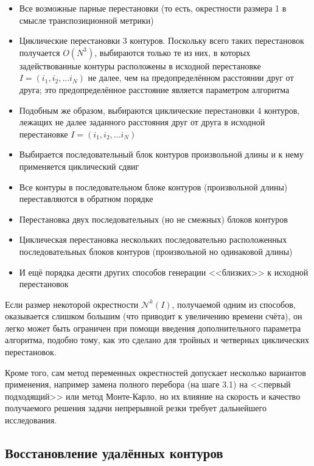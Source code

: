 \documentclass[14pt]{extarticle}
\theoremstyle{plain}%
\theoremstyle{definition}
\theoremstyle{remark}
\begin{document}
\begin{itemize}
  \item
  Все возможные парные перестановки
  (то есть, окрестности размера 1 в смысле транспозиционной метрики)
  \item
  Циклические перестановки 3 контуров.
  Поскольку всего таких перестановок получается
  $O (N ^ 3)$,
  выбираются только те из них,
  в которых задействованные контуры расположены
  в исходной перестановке
  $I = (i_1, i_2, ... i_N)$
  не далее, чем на предопределённом расстоянии
  друг от друга;
  это предопределённое расстояние является
  параметром алгоритма
  \item
  Подобным же образом,
  выбираются циклические перестановки 4 контуров,
  лежащих не далее заданного расстояния
  друг от друга в исходной перестановке
  $I = (i_1, i_2, ... i_N)$
  \item
  Выбирается последовательный блок контуров
  произвольной длины и к нему применяется
  циклический сдвиг
  \item
  Все контуры в последовательном блоке
  контуров
  (произвольной длины)
  переставляются в обратном порядке
  \item
  Перестановка двух последовательных
  (но не смежных) блоков контуров
  \item
  Циклическая перестановка нескольких
  последовательно расположенных
  последовательных блоков контуров
  (произвольной но одинаковой длины)
  \item
  И ещё порядка десяти других способов генерации
  <<близких>> к исходной перестановок
\end{itemize}

Если размер некоторой окрестности
$\mathcal N^k(I)$,
получаемой одним из способов,
оказывается слишком большим
(что приводит к увеличению времени счёта),
он легко может быть ограничен
при помощи введения дополнительного параметра
алгоритма,
подобно тому,
как это сделано для тройных
и четверных циклических перестановок.

Кроме того,
сам метод переменных окрестностей
допускает несколько вариантов применения,
например замена полного перебора
(на шаге 3.1)
на <<первый подходящий>>
или метод Монте-Карло,
но их влияние на скорость
и качество получаемого решения
задачи непрерывной резки
требует дальнейшего исследования.

\subsection{Восстановление удалённых контуров}
\end{document}
